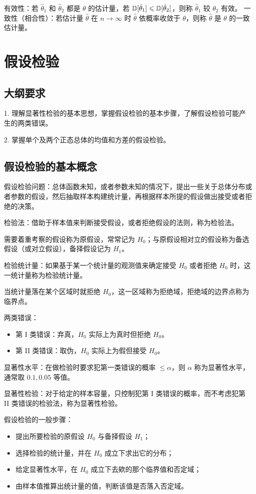 有效性：若 $\hat{\theta}_1$ 和 $\hat{\theta}_2$ 都是 $\theta$ 的估计量，若 $\mathbb{D}[\hat{\theta}_1] \leqslant \mathbb{D}[\hat{\theta}_2]$，则称 $\hat{\theta}_1$ 较 $\hat{\theta}_2$ 有效。
一致性（相合性）：若估计量 $\hat{\theta}$ 在 $n \to \infty$ 时 $\hat{\theta}$ 依概率收敛于 $\theta$，则称 $\hat{\theta}$ 是 $\theta$ 的一致估计量。

\section{假设检验}

\subsection{大纲要求}

1. 理解显著性检验的基本思想，掌握假设检验的基本步骤，了解假设检验可能产生的两类错误。

2. 掌握单个及两个正态总体的均值和方差的假设检验。

\subsection{假设检验的基本概念}

假设检验问题：总体函数未知，或者参数未知的情况下，提出一些关于总体分布或者参数的假设，然后抽取样本构建统计量，再根据样本所提的假设做出接受或者拒绝的决策。

检验法：借助于样本值来判断接受假设，或者拒绝假设的法则，称为检验法。

需要着重考察的假设称为原假设，常常记为 $H_0$；与原假设相对立的假设称为备选假设（或对立假设），备择假设记为 $H_1$。

检验统计量：如果基于某一个统计量的观测值来确定接受 $H_0$ 或者拒绝 $H_0$ 时，这一统计量称为检验统计量。

当统计量落在某个区域时就拒绝 $H_0$，这一区域称为拒绝域，拒绝域的边界点称为临界点。

两类错误：
\begin{itemize}
	\item 第 I 类错误：弃真，$H_0$ 实际上为真时但拒绝 $H_0$。
	\item 第 II 类错误：取伪，$H_0$ 实际上为假但接受 $H_0$。
\end{itemize}

显著性水平：在做检验时要求犯第一类错误的概率 $\leqslant \alpha$，则 $\alpha$ 称为显著性水平，通常取 $0.1, 0.05$ 等值。

显著性检验：对于给定的样本容量，只控制犯第 I 类错误的概率，而不考虑犯第 II 类错误的检验法，称为显著性检验。

假设检验的一般步骤：
\begin{itemize}
	\item 提出所要检验的原假设 $H_0$ 与备择假设 $H_1$；
	\item 选择检验的统计量，并在 $H_0$ 成立下求出它的分布；
	\item 给定显著性水平，在 $H_0$ 成立下去欸的那个临界值和否定域；
	\item 由样本值推算出统计量的值，判断该值是否落入否定域。
\end{itemize}
